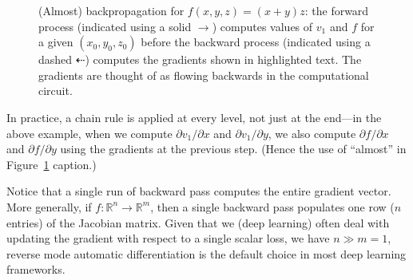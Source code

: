 \begin{figure}[!t]
\centering
{}
\caption{(Almost) backpropagation for $f(x, y, z) = (x + y) z$: the forward process (indicated using a solid $\rightarrow$) computes values of $v_1$ and $f$ for a given $(x_0, y_0, z_0)$ before the backward process (indicated using a dashed $\dashleftarrow$) computes the gradients  shown in \colorbox{gray!30}{highlighted} text. The gradients are thought of as flowing backwards in the computational circuit.}
\label{fig:3}
\end{figure}

In practice, a chain rule is applied at every level, not just at the end---in the above example, when we compute $\partial v_1/\partial x$ and $\partial v_1/\partial y$, we also compute $\partial f/\partial x$ and $\partial f/\partial y$ using the gradients at the previous step. (Hence the use of ``almost'' in Figure~\ref{fig:3} caption.)

Notice that a single run of backward pass computes the entire gradient vector. More generally, if $f: \mathbb{R}^n \rightarrow \mathbb{R}^m$, then a single backward pass populates one row ($n$ entries) of the Jacobian matrix. Given that we (deep learning) often deal with updating the gradient with respect to a single scalar loss, we have $n \gg m = 1$, reverse mode automatic differentiation is the default choice in most deep learning frameworks.

